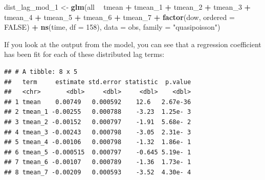 \documentclass[
]{book}
\newenvironment{Shaded}{\begin{snugshade}}{\end{snugshade}}
\newcommand{\DataTypeTok}[1]{\textcolor[rgb]{0.13,0.29,0.53}{#1}}
\newcommand{\DecValTok}[1]{\textcolor[rgb]{0.00,0.00,0.81}{#1}}
\newcommand{\KeywordTok}[1]{\textcolor[rgb]{0.13,0.29,0.53}{\textbf{#1}}}
\newcommand{\NormalTok}[1]{#1}
\newcommand{\OperatorTok}[1]{\textcolor[rgb]{0.81,0.36,0.00}{\textbf{#1}}}
\newcommand{\OtherTok}[1]{\textcolor[rgb]{0.56,0.35,0.01}{#1}}
\newcommand{\StringTok}[1]{\textcolor[rgb]{0.31,0.60,0.02}{#1}}
\begin{document}
\begin{Shaded}
\begin{Highlighting}[]
\NormalTok{dist_lag_mod_}\DecValTok{1}\NormalTok{ <-}\StringTok{ }\KeywordTok{glm}\NormalTok{(all }\OperatorTok{~}\StringTok{ }\NormalTok{tmean }\OperatorTok{+}\StringTok{ }\NormalTok{tmean_}\DecValTok{1} \OperatorTok{+}\StringTok{ }\NormalTok{tmean_}\DecValTok{2} \OperatorTok{+}\StringTok{ }\NormalTok{tmean_}\DecValTok{3} \OperatorTok{+}\StringTok{ }\NormalTok{tmean_}\DecValTok{4} \OperatorTok{+}\StringTok{ }
\StringTok{                        }\NormalTok{tmean_}\DecValTok{5} \OperatorTok{+}\StringTok{ }\NormalTok{tmean_}\DecValTok{6} \OperatorTok{+}\StringTok{ }\NormalTok{tmean_}\DecValTok{7} \OperatorTok{+}\StringTok{ }
\StringTok{                        }\KeywordTok{factor}\NormalTok{(dow, }\DataTypeTok{ordered =} \OtherTok{FALSE}\NormalTok{) }\OperatorTok{+}
\StringTok{                          }\KeywordTok{ns}\NormalTok{(time, }\DataTypeTok{df =} \DecValTok{158}\NormalTok{), }
                        \DataTypeTok{data =}\NormalTok{ obs, }\DataTypeTok{family =} \StringTok{"quasipoisson"}\NormalTok{)}
\end{Highlighting}
\end{Shaded}

If you look at the output from the model, you can see that a regression coefficient has been
fit for each of these distributed lag terms:

\begin{Shaded}
\end{Shaded}

\begin{verbatim}
## # A tibble: 8 x 5
##   term     estimate std.error statistic  p.value
##   <chr>       <dbl>     <dbl>     <dbl>    <dbl>
## 1 tmean    0.00749   0.000592    12.6   2.67e-36
## 2 tmean_1 -0.00255   0.000788    -3.23  1.25e- 3
## 3 tmean_2 -0.00152   0.000797    -1.91  5.68e- 2
## 4 tmean_3 -0.00243   0.000798    -3.05  2.31e- 3
## 5 tmean_4 -0.00106   0.000798    -1.32  1.86e- 1
## 6 tmean_5 -0.000515  0.000797    -0.645 5.19e- 1
## 7 tmean_6 -0.00107   0.000789    -1.36  1.73e- 1
## 8 tmean_7 -0.00209   0.000593    -3.52  4.30e- 4
\end{verbatim}
\end{document}
